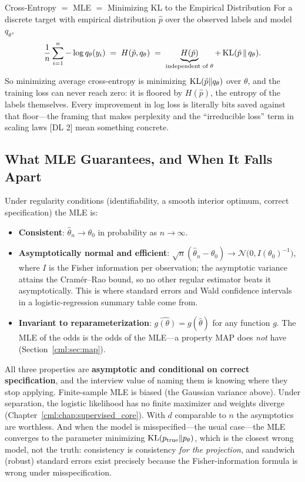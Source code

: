 \begin{mathresult}{Cross-Entropy $=$ MLE $=$ Minimizing KL to the Empirical Distribution}
For a discrete target with empirical distribution $\hat p$ over the observed labels and model $q_\theta$,
\begin{equation}
\frac{1}{n}\sum_{i=1}^n -\log q_\theta(y_i) \;=\; H(\hat p, q_\theta) \;=\; \underbrace{H(\hat p)}_{\text{independent of }\theta} + \operatorname{KL}(\hat p \,\|\, q_\theta).
\end{equation}
So minimizing average cross-entropy is minimizing $\operatorname{KL}(\hat p \| q_\theta)$ over $\theta$, and the training loss can never reach zero: it is floored by $H(\hat p)$, the entropy of the labels themselves. Every improvement in log loss is literally bits saved against that floor---the framing that makes perplexity and the ``irreducible loss'' term in scaling laws [DL 2] mean something concrete.
\end{mathresult}

\subsection{What MLE Guarantees, and When It Falls Apart}

Under regularity conditions (identifiability, a smooth interior optimum, correct specification) the MLE is:
\begin{itemize}
    \item \textbf{Consistent}: $\hat\theta_n \to \theta_0$ in probability as $n \to \infty$.
    \item \textbf{Asymptotically normal and efficient}: $\sqrt{n}(\hat\theta_n - \theta_0) \to \mathcal{N}\big(0, I(\theta_0)^{-1}\big)$, where $I$ is the Fisher information per observation; the asymptotic variance attains the Cramér--Rao bound, so no other regular estimator beats it asymptotically. This is where standard errors and Wald confidence intervals in a logistic-regression summary table come from.
    \item \textbf{Invariant to reparameterization}: $\widehat{g(\theta)} = g(\hat\theta)$ for any function $g$. The MLE of the odds is the odds of the MLE---a property MAP does \textit{not} have (Section~\ref{cml:sec:map}).
\end{itemize}

\begin{warningbox}
All three properties are \textbf{asymptotic and conditional on correct specification}, and the interview value of naming them is knowing where they stop applying. Finite-sample MLE is biased (the Gaussian variance above). Under separation, the logistic likelihood has no finite maximizer and weights diverge (Chapter~\ref{cml:chap:supervised_core}). With $d$ comparable to $n$ the asymptotics are worthless. And when the model is misspecified---the usual case---the MLE converges to the parameter minimizing $\operatorname{KL}(p_{\text{true}} \| p_\theta)$, which is the closest wrong model, not the truth: consistency is consistency \textit{for the projection}, and sandwich (robust) standard errors exist precisely because the Fisher-information formula is wrong under misspecification.
\end{warningbox}

